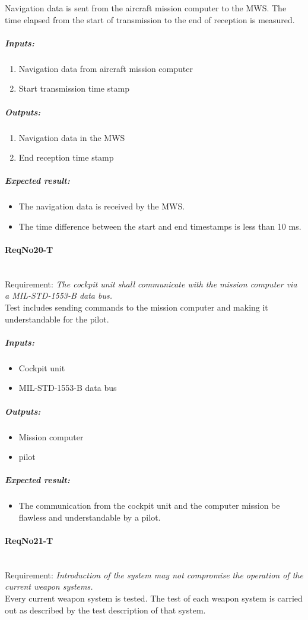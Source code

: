 Navigation data is sent from the aircraft mission computer to the MWS. The time elapsed from the start of transmission to the end of reception is measured.
\subparagraph{Inputs:}
	\begin{enumerate}
	\item Navigation data from aircraft mission computer
	\item Start transmission time stamp
	\end{enumerate}
\subparagraph{Outputs:}
	\begin{enumerate}
	\item Navigation data in the MWS
	\item End reception time stamp
	\end{enumerate}
\subparagraph{Expected result:}
	\begin{itemize}
	\item The navigation data is received by the MWS.
	\item The time difference between the start and end timestamps is less than 10 ms. 
	\end{itemize}

\paragraph{ReqNo20-T}\mbox{}\\ %
Requirement: \textit{The cockpit unit shall communicate with the mission computer via a MIL-STD-1553-B data bus.}\\
Test includes sending commands to the mission computer and making it understandable for the pilot.
	\subparagraph{Inputs:}
	\begin{itemize}
	\item Cockpit unit
	\item MIL-STD-1553-B data bus
	\end{itemize}
	\subparagraph{Outputs:}
	\begin{itemize}
	\item Mission computer
	\item pilot
	\end{itemize}
	\subparagraph{Expected result:}
	\begin{itemize}
	\item The communication from the cockpit unit and the computer mission be flawless and understandable by a pilot.
	\end{itemize}
	
\paragraph{ReqNo21-T}\mbox{}\\ %
Requirement: \textit{Introduction of the system may not compromise the operation of the current weapon systems.}
\\
Every current weapon system is tested. The test of each weapon system is carried out as described by the test description of that system.

